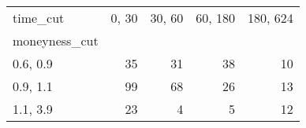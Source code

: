 \begin{tabular}{lrrrr}
\toprule
time\_cut &  0, 30 &  30, 60 &  60, 180 &  180, 624 \\
moneyness\_cut &          &           &            &             \\
\midrule
0.6, 0.9    &       35 &        31 &         38 &          10 \\
0.9, 1.1    &       99 &        68 &         26 &          13 \\
1.1, 3.9    &       23 &         4 &          5 &          12 \\
\bottomrule
\end{tabular}
